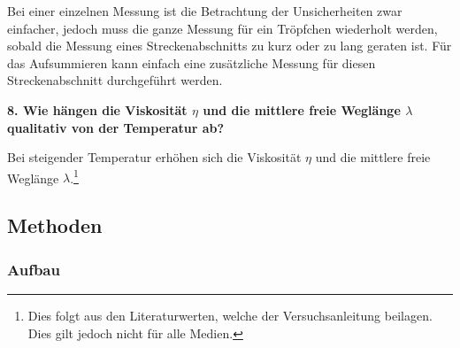 Bei einer einzelnen Messung ist die Betrachtung der Unsicherheiten zwar einfacher, jedoch muss die ganze Messung für ein Tröpfchen wiederholt werden, sobald die Messung eines Streckenabschnitts zu kurz oder zu lang geraten ist. Für das Aufsummieren kann einfach eine zusätzliche Messung für diesen Streckenabschnitt durchgeführt werden.

\vspace{0,5cm}
\noindent \textbf{8. Wie hängen die Viskosität $\eta$ und die mittlere freie Weglänge $\lambda$ qualitativ von der Temperatur ab?}

Bei steigender Temperatur erhöhen sich die Viskosität $\eta$ und die mittlere freie Weglänge $\lambda$.\footnote{Dies folgt aus den Literaturwerten, welche der Versuchsanleitung beilagen. Dies gilt jedoch nicht für alle Medien.}

\subsection{Methoden}

\subsubsection{Aufbau}

